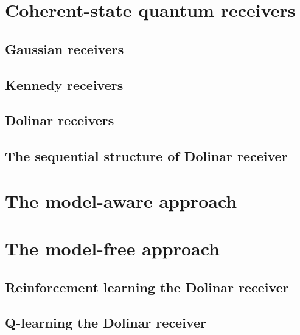 
\section{Coherent-state quantum receivers}\label{sec:rl_coh_quantum_receivers}

\subsection{Gaussian receivers}
\label{ssec:1_gaussian_receivers}
\subsection{Kennedy receivers}\label{ssec:rlcoh_kennedyreceiver}

\subsection{Dolinar receivers}\label{ssec:rlcoh_dolinarreceiver}

\subsection{The sequential structure of Dolinar receiver}\label{ssec:3bis_intuition}


\section{The model-aware approach}\label{sec:rlcoh_model_aware_approach_intro}


\section{The model-free approach}\label{sec:rl_coh_model_free}

\subsection{Reinforcement learning the Dolinar receiver}\label{ssec:rl_cohql}

\subsection{Q-learning the Dolinar receiver}\label{ssec:rlcoh_qlearning}


